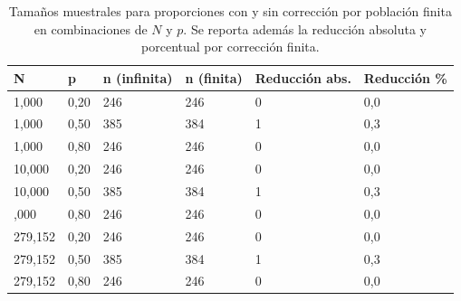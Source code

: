 \begin{table}

\caption{Tamaños muestrales para proporciones con y sin corrección por población finita en combinaciones de \(N\) y \(p\). Se reporta además la reducción absoluta y porcentual por corrección finita.}
\centering
\begin{tabular}[t]{llllll}
\toprule
N & p & n (infinita) & n (finita) & Reducción abs. & Reducción \%\\
\midrule
1,000 & 0,20 & 246 & 246 & 0 & 0,0\\
1,000 & 0,50 & 385 & 384 & 1 & 0,3\\
1,000 & 0,80 & 246 & 246 & 0 & 0,0\\
10,000 & 0,20 & 246 & 246 & 0 & 0,0\\
10,000 & 0,50 & 385 & 384 & 1 & 0,3\\
\addlinespace
10,000 & 0,80 & 246 & 246 & 0 & 0,0\\
279,152 & 0,20 & 246 & 246 & 0 & 0,0\\
279,152 & 0,50 & 385 & 384 & 1 & 0,3\\
279,152 & 0,80 & 246 & 246 & 0 & 0,0\\
\bottomrule
\end{tabular}
\end{table}
